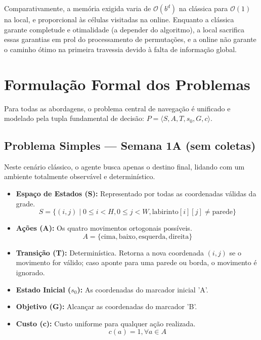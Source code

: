 \documentclass[12pt,a4paper]{article}
\begin{document}
Comparativamente, a memória exigida varia de $\mathcal{O}(b^d)$ na clássica para $\mathcal{O}(1)$ na local, e proporcional às células visitadas na online. Enquanto a clássica garante completude e otimalidade (a depender do algoritmo), a local sacrifica essas garantias em prol do processamento de permutações, e a online não garante o caminho ótimo na primeira travessia devido à falta de informação global.

\section{Formulação Formal dos Problemas}
Para todas as abordagens, o problema central de navegação é unificado e modelado pela tupla fundamental de decisão: $P = \langle S, A, T, s_0, G, c \rangle$.

\subsection{Problema Simples — Semana 1A (sem coletas)}
Neste cenário clássico, o agente busca apenas o destino final, lidando com um ambiente totalmente observável e determinístico.
\begin{itemize}
    \item \textbf{Espaço de Estados (S):} Representado por todas as coordenadas válidas da grade.
    $$S = \{ (i,j) \mid 0 \le i < H, 0 \le j < W, \text{labirinto}[i][j] \neq \text{parede} \}$$
    \item \textbf{Ações (A):} Os quatro movimentos ortogonais possíveis.
    $$A = \{ \text{cima}, \text{baixo}, \text{esquerda}, \text{direita} \}$$
    \item \textbf{Transição (T):} Determinística. Retorna a nova coordenada $(i,j)$ se o movimento for válido; caso aponte para uma parede ou borda, o movimento é ignorado.
    \item \textbf{Estado Inicial ($s_0$):} As coordenadas do marcador inicial 'A'.
    \item \textbf{Objetivo (G):} Alcançar as coordenadas do marcador 'B'.
    \item \textbf{Custo (c):} Custo uniforme para qualquer ação realizada.
    $$c(a) = 1, \forall a \in A$$
\end{itemize}
\end{document}
